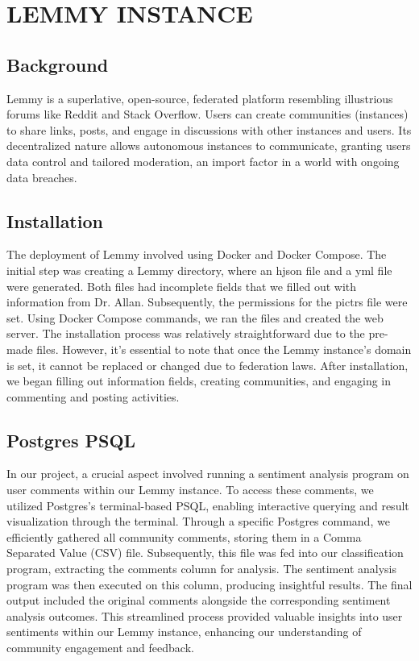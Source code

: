 \documentclass[letterpaper, 12 pt, conference]{ieeeconf}
\begin{document}
\section{LEMMY INSTANCE}

\subsection{Background}

Lemmy is a superlative, open-source, federated platform resembling illustrious forums like Reddit and Stack Overflow. Users can create communities (instances) to share links, posts, and engage in discussions with other instances and users. Its decentralized nature allows autonomous instances to communicate, granting users data control and tailored moderation, an import factor in a world with ongoing data breaches.


\subsection{Installation}

The deployment of Lemmy involved using Docker and Docker Compose. The initial step was creating a Lemmy directory, where an hjson file and a yml file were generated. Both files had incomplete fields that we filled out with information from Dr. Allan. Subsequently, the permissions for the pictrs file were set. Using Docker Compose commands, we ran the files and created the web server. The installation process was relatively straightforward due to the pre-made files. However, it's essential to note that once the Lemmy instance's domain is set, it cannot be replaced or changed due to federation laws. After installation, we began filling out information fields, creating communities, and engaging in commenting and posting activities.


\subsection{Postgres PSQL}
In our project, a crucial aspect involved running a sentiment analysis program on user comments within our Lemmy instance. To access these comments, we utilized Postgres's terminal-based PSQL, enabling interactive querying and result visualization through the terminal. Through a specific Postgres command, we efficiently gathered all community comments, storing them in a Comma Separated Value (CSV) file. Subsequently, this file was fed into our classification program, extracting the comments column for analysis. The sentiment analysis program was then executed on this column, producing insightful results. The final output included the original comments alongside the corresponding sentiment analysis outcomes. This streamlined process provided valuable insights into user sentiments within our Lemmy instance, enhancing our understanding of community engagement and feedback.
\end{document}
